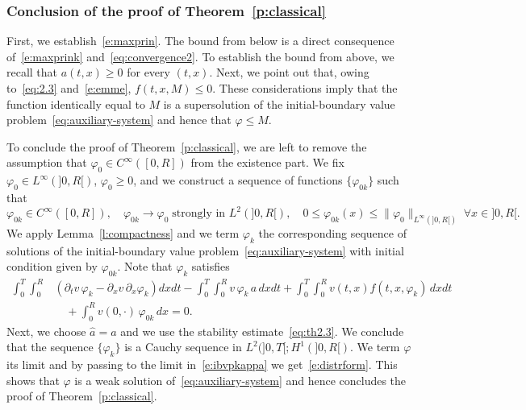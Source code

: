 \documentclass[11pt,leqno]{amsart}
\numberwithin{equation}{section}
\begin{document}
\subsubsection{Conclusion of the proof of Theorem~\ref{p:classical}}
\label{sss:concludiamo}
First, we establish~\eqref{e:maxprin}. The bound from below is a direct consequence 
of~\eqref{e:maxprink} and~\eqref{eq:convergence2}. To establish the bound from above, we recall that $a(t, x) \ge 0$ for every $(t, x)$. Next, we point out that, 
owing to~\eqref{eq:2.3} and~\eqref{e:emme}, $f(t, x, M) \leq 0$. These considerations  
imply that the function identically equal to $M$ is a supersolution of the initial-boundary value problem~\eqref{eq:auxiliary-system} and hence that ${\varphi} \leq M$. 

To conclude the proof of Theorem~\ref{p:classical}, we are left to remove the assumption that ${\varphi}_0 \in C^\infty([0, R])$ from the existence part. We fix ${\varphi}_0 \in L^\infty(]0, R[)$, ${\varphi}_0 \ge0$, and we construct a sequence of functions $\{ {\varphi}_{0k} \}$ such that 
\begin{equation}
  {\varphi}_{0k} \in C^\infty([0, R]), \quad
  {\varphi}_{0k} \to {\varphi}_0 \; \text{strongly in $L^2(]0, R[)$}, \quad
  0 \leq {\varphi}_{0k} (x) \leq \| {\varphi}_{0} \|_{L^\infty (]0, R[)} \; 
  \forall x \in ]0, R[.
\end{equation}
We apply Lemma~\ref{l:compactness} and we term ${\varphi}_k$
the corresponding sequence of solutions of the initial-boundary
value problem~\eqref{eq:auxiliary-system}
with initial condition given by
${\varphi}_{0k}$. Note that ${\varphi}_k$ satisfies 
\begin{equation}
\label{e:ibvpkappa}
\begin{split}
\int_0^T \!\int_0^R &
 \left({\partial_t} v \,  {\varphi}_k-{\partial_x } v\, {\partial_x } {\varphi}_k
  \right) dx dt-\int_0^T\! \int_0^R v \, {\varphi}_k \, a \, dx dt 
+\int_0^T \! \int_0^R v (t, x) f (t, x, {\varphi}_k) \, dxdt \\
& \quad +
\int_0^Rv(0, \cdot )\, {\varphi}_{0k} \, dx=0.
\end{split}
\end{equation}
Next, we choose $\hat a=a$ and we use the stability estimate~\eqref{eq:th2.3}. We conclude that the sequence 
$\{ {\varphi}_k \}$ is a Cauchy sequence in $L^2 (]0, T[; H^1 (]0, R[)$. We term ${\varphi}$ its limit and by passing to the limit in~\eqref{e:ibvpkappa} we get~\eqref{e:distrform}. This shows that 
${\varphi}$ is a weak solution of~\eqref{eq:auxiliary-system} and hence concludes the proof of Theorem~\ref{p:classical}.   
\end{document}

